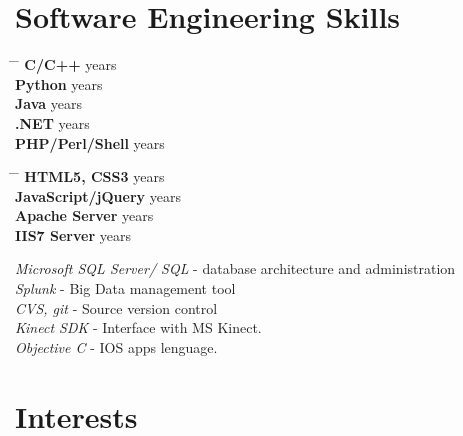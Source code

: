\documentclass[10pt]{article} %
\begin{document}
\section{Software Engineering Skills}
\parbox{0.5\textwidth}{ %
\begin{tabbing}
\hspace{5cm} \= \hspace{4cm} \= \kill %
{\bf C/C++}  years \\
{\bf Python}  years \\
{\bf Java}  years \\ 
{\bf .NET}  years \\
{\bf PHP/Perl/Shell}  years
\end{tabbing}}
\hfill %
\parbox{0.5\textwidth}{ %
\begin{tabbing}
\hspace{5cm} \= \hspace{4cm} \= \kill %
{\bf HTML5, CSS3}  years \\
{\bf JavaScript/jQuery}  years \\
{\bf Apache Server}  years \\ 
{\bf IIS7 Server}  years
\end{tabbing}}


{
\textit{Microsoft SQL Server/ SQL} - database architecture and administration\\
\textit{Splunk} - Big Data management tool\\
\textit{CVS, git} - Source version control\\
\textit{Kinect SDK} - Interface with MS Kinect. \\
\textit{Objective C} - IOS apps lenguage.
}


\section{Interests}

\end{document}
